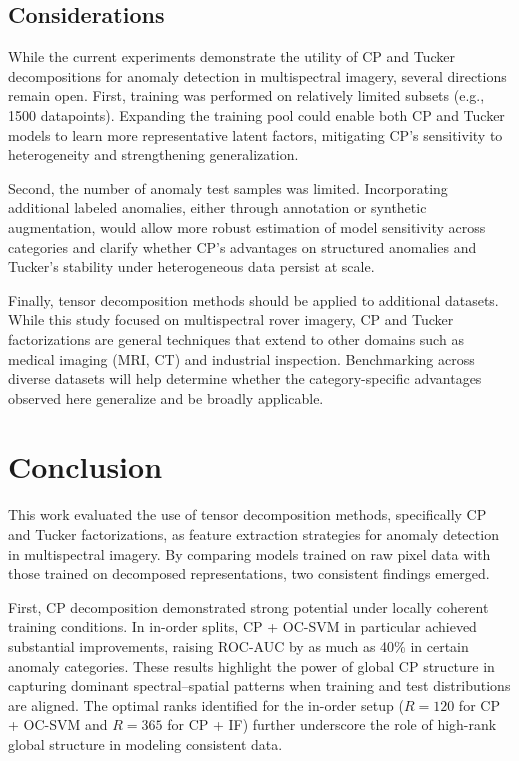 \documentclass[11pt]{article}
\begin{document}
\subsection{Considerations}

While the current experiments demonstrate the utility of CP and Tucker decompositions for anomaly detection in multispectral imagery, several directions remain open. First, training was performed on relatively limited subsets (e.g., 1500 datapoints). Expanding the training pool could enable both CP and Tucker models to learn more representative latent factors, mitigating CP’s sensitivity to heterogeneity and strengthening generalization.  

Second, the number of anomaly test samples was limited. Incorporating additional labeled anomalies, either through annotation or synthetic augmentation, would allow more robust estimation of model sensitivity across categories and clarify whether CP’s advantages on structured anomalies and Tucker’s stability under heterogeneous data persist at scale.  

Finally, tensor decomposition methods should be applied to additional datasets. While this study focused on multispectral rover imagery, CP and Tucker factorizations are general techniques that extend to other domains such as medical imaging (MRI, CT) and industrial inspection. Benchmarking across diverse datasets will help determine whether the category-specific advantages observed here generalize and be broadly applicable.  


\section{Conclusion}
\label{sec:conclusion}

This work evaluated the use of tensor decomposition methods, specifically CP and Tucker factorizations, as feature extraction strategies for anomaly detection in multispectral imagery. By comparing models trained on raw pixel data with those trained on decomposed representations, two consistent findings emerged.    

First, CP decomposition demonstrated strong potential under locally coherent training conditions. In in-order splits, CP + OC-SVM in particular achieved substantial improvements, raising ROC-AUC by as much as 40\% in certain anomaly categories. These results highlight the power of global CP structure in capturing dominant spectral–spatial patterns when training and test distributions are aligned. The optimal ranks identified for the in-order setup (\(R=120\) for CP + OC-SVM and \(R=365\) for CP + IF) further underscore the role of high-rank global structure in modeling consistent data.  
\end{document}
